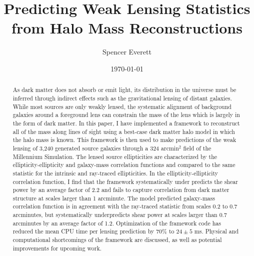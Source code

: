 \documentclass[%
 reprint,
 amsmath,amssymb,
 aps,nofootinbib
]{revtex4-1}
\begin{document}

\title{Predicting Weak Lensing Statistics from Halo Mass Reconstructions}

\author{Spencer Everett}


\date{\today}

\begin{abstract}
As dark matter does not absorb or emit light, its distribution in the universe must be inferred through indirect effects such as the gravitational lensing of distant galaxies. While most sources are only weakly lensed, the systematic alignment of background galaxies around a foreground lens can constrain the mass of the lens which is largely in the form of dark matter. In this paper, I have implemented a framework to reconstruct all of the mass along lines of sight using a  best-case dark matter halo model in which the halo mass is known. This framework is then used to make predictions of the weak lensing of 3,240 generated source galaxies through a 324 arcmin$^2$ field of the Millennium Simulation. The lensed source ellipticities are characterized by the ellipticity-ellipticity and galaxy-mass correlation functions and compared to the same statistic for the intrinsic and ray-traced ellipticities. In the ellipticity-ellipticity correlation function, I find that the framework systematically under predicts the shear power by an average factor of 2.2 and fails to capture correlation from dark matter structure at scales larger than 1 arcminute. The model predicted galaxy-mass correlation function is in agreement with the ray-traced statistic from scales 0.2 to 0.7 arcminutes, but systematically underpredicts shear power at scales larger than 0.7 arcminutes by an average factor of 1.2. Optimization of the framework code has reduced the mean CPU time per lensing prediction by 70\% to $24\pm5$ ms. Physical and computational shortcomings of the framework are discussed, as well as potential improvements for upcoming work.
\end{abstract}

\maketitle
\end{document}
